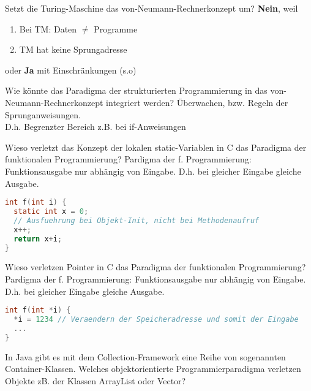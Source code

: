 \begin{card}
	Setzt die Turing-Maschine das von-Neumann-Rechnerkonzept um?
	\hr
	\textbf{Nein}, weil
	\begin{enumerate}
	\item Bei TM: Daten $\neq$ Programme
	\item TM hat keine Sprungadresse
	\end{enumerate}
	oder \textbf{Ja} mit Einschränkungen (s.o)
\end{card}

\begin{card}
	Wie könnte das Paradigma der strukturierten Programmierung in das von-Neumann-Rechnerkonzept integriert werden?
	\hr
	Überwachen, bzw. Regeln der Sprunganweisungen.\\
	D.h. Begrenzter Bereich z.B. bei if-Anweisungen
\end{card}

\begin{card}
	Wieso verletzt das Konzept der lokalen static-Variablen in C das Paradigma der funktionalen
	Programmierung?
	\hr
	Pardigma der f. Programmierung: Funktionsausgabe nur abhängig von Eingabe. D.h. bei gleicher Eingabe gleiche Ausgabe.
	\begin{lstlisting}[language=C]
int f(int i) {
  static int x = 0; 
  // Ausfuehrung bei Objekt-Init, nicht bei Methodenaufruf
  x++;
  return x+i;
}
	\end{lstlisting}	
\end{card}

\begin{card}
	Wieso verletzen Pointer in C das Paradigma der funktionalen Programmierung?
	\hr
	Pardigma der f. Programmierung: Funktionsausgabe nur abhängig von Eingabe.  D.h. bei gleicher Eingabe gleiche Ausgabe.
	\begin{lstlisting}[language=C]
int f(int *i) {
  *i = 1234 // Veraendern der Speicheradresse und somit der Eingabe
  ...
}
	\end{lstlisting}	
\end{card}

\begin{card}
	In Java gibt es mit dem Collection-Framework eine Reihe von sogenannten Container-Klassen. Welches objektorientierte Programmierparadigma verletzen Objekte zB. der Klassen	ArrayList oder Vector? 
	\hr
	
\end{card}